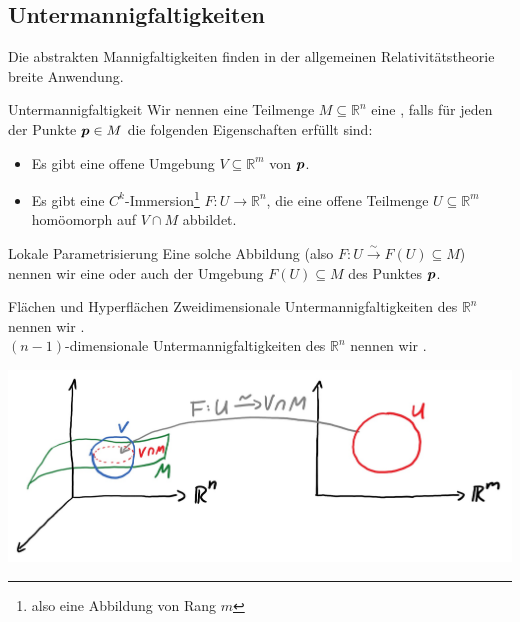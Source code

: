 \subsection{Untermannigfaltigkeiten}
 Die abstrakten Mannigfaltigkeiten finden in der allgemeinen Relativitätstheorie breite Anwendung.
\begin{Def}
{Untermannigfaltigkeit}
Wir nennen eine Teilmenge $M\subseteq\mathbb{R}^n$ eine , falls für jeden der Punkte ${{\text{\boldmath${p}$}}}\in M$ die folgenden Eigenschaften erfüllt sind:
\begin{itemize}
    \item Es gibt eine offene Umgebung $V\subseteq\mathbb{R}^m$ von ${{\text{\boldmath${p}$}}}$.
    \item Es gibt eine $C^k$-Immersion\footnote{also eine Abbildung von Rang $m$} $F:U\to\mathbb{R}^n$, die eine offene Teilmenge $U\subseteq\mathbb{R}^m$ homöomorph auf $V\cap M$ abbildet.
\end{itemize}
\end{Def}
\begin{Def}
{Lokale Parametrisierung}
Eine solche Abbildung (also $F:U\overset{\sim}{\to}F(U)\subseteq M$) nennen wir eine  oder auch  der Umgebung $F(U)\subseteq M$ des Punktes ${{\text{\boldmath${p}$}}}$.
\end{Def}
\begin{Def}
{Flächen und Hyperflächen}
Zweidimensionale Untermannigfaltigkeiten des $\mathbb{R}^n$ nennen wir .\\
$(n-1)$-dimensionale Untermannigfaltigkeiten des $\mathbb{R}^n$ nennen wir .
\end{Def}
\begin{center}
    \includegraphics[width=.8\textwidth]{Dateien/10/10Untermannigfaltigkeiten.jpg}
\end{center}
